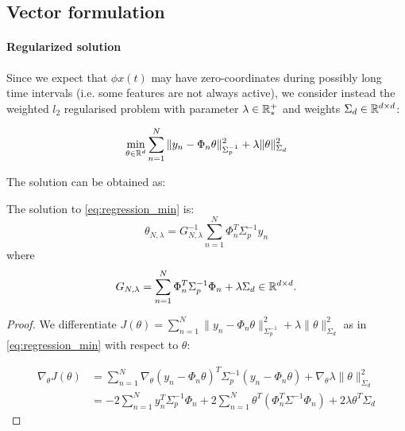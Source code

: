 \documentclass{article}
\begin{document}
{\color{gray}
\subsection{Vector formulation}


\paragraph{Regularized solution} Since we expect that $\phi x(t)$ may have zero-coordinates during possibly long time intervals (i.e. some features are not always active), we consider instead the weighted $l_2$ regularised problem with parameter $\lambda\in\mathbb{R}^+_*$ and weights $\Sigma_d\in\mathbb{R}^{d\times d}$:


\begin{equation}
    \label{eq:regression_min}
    \min_{\theta\in\mathbb{R}^d} \sum_{n=1}^N \|y_n -\Phi_n\theta\|_{\Sigma_p^{-1}}^2 + \lambda\|\theta\|_{\Sigma_d}^2
\end{equation}


The solution can be obtained as:

\begin{theorem} The solution to \eqref{eq:regression_min} is:
\begin{equation}
    \label{eq:vector_rls}
    \theta_{N,\lambda} = G_{N, \lambda}^{-1} \sum_{n=1}^N \Phi_n^T \Sigma_p^{-1} y_n
\end{equation}
where 
\begin{equation*}
    G_{N, \lambda} = \sum_{n=1}^N \Phi_{n}^T\Sigma_p^{-1}\Phi_{n}  + \lambda \Sigma_d \in \mathbb{R}^{d\times d}.
\end{equation*}
\end{theorem}


\begin{proof}
We differentiate $J(\theta) = \sum_{n=1}^N \|y_n -\Phi_n\theta\|_{\Sigma_p^{-1}}^2 + \lambda\|\theta\|_{\Sigma_d}^2$ as in  \eqref{eq:regression_min} with respect to $\theta$:

\begin{align*}
    \nabla_{\theta} J(\theta) &= \sum_{n=1}^N\nabla_{\theta} (y_n - \Phi_n\theta)^T\Sigma_p^{-1}(y_n - \Phi_n\theta) + \nabla_{\theta} \lambda\|\theta\|_{\Sigma_d}^2\\
    &= -2\sum_{n=1}^N y_n^T\Sigma_p^{-1}\Phi_n + 2\sum_{n=1}^N\theta^T(\Phi_n^T\Sigma^{-1}\Phi_n) +  2 \lambda \theta^T \Sigma_d
\end{align*}


\end{proof}}
\end{document}
